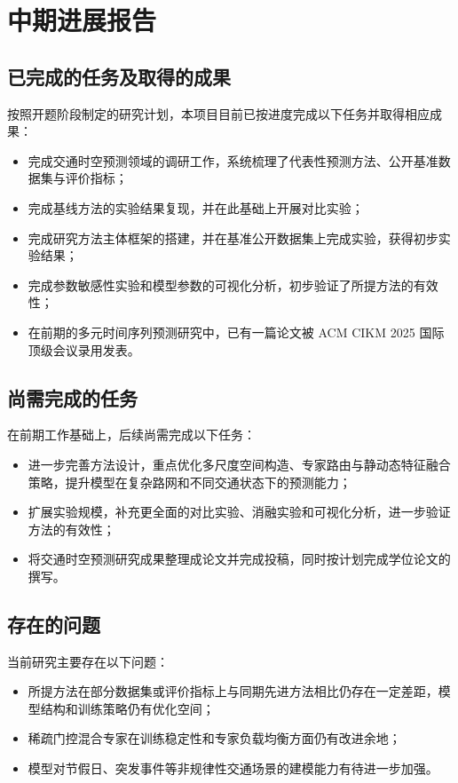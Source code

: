 \chapter{中期进展报告}


\section{已完成的任务及取得的成果}

按照开题阶段制定的研究计划，本项目目前已按进度完成以下任务并取得相应成果：
\begin{itemize}
    \item 完成交通时空预测领域的调研工作，系统梳理了代表性预测方法、公开基准数据集与评价指标；
    \item 完成基线方法的实验结果复现，并在此基础上开展对比实验；
    \item 完成研究方法主体框架的搭建，并在基准公开数据集上完成实验，获得初步实验结果；
    \item 完成参数敏感性实验和模型参数的可视化分析，初步验证了所提方法的有效性；
    \item 在前期的多元时间序列预测研究中，已有一篇论文被 ACM CIKM 2025 国际顶级会议录用发表。
\end{itemize}

\section{尚需完成的任务}

在前期工作基础上，后续尚需完成以下任务：
\begin{itemize}
    \item 进一步完善方法设计，重点优化多尺度空间构造、专家路由与静动态特征融合策略，提升模型在复杂路网和不同交通状态下的预测能力；
    \item 扩展实验规模，补充更全面的对比实验、消融实验和可视化分析，进一步验证方法的有效性；
    \item 将交通时空预测研究成果整理成论文并完成投稿，同时按计划完成学位论文的撰写。
\end{itemize}

\section{存在的问题}

当前研究主要存在以下问题：
\begin{itemize}
    \item 所提方法在部分数据集或评价指标上与同期先进方法相比仍存在一定差距，模型结构和训练策略仍有优化空间；
    \item 稀疏门控混合专家在训练稳定性和专家负载均衡方面仍有改进余地；
    \item 模型对节假日、突发事件等非规律性交通场景的建模能力有待进一步加强。
\end{itemize}

